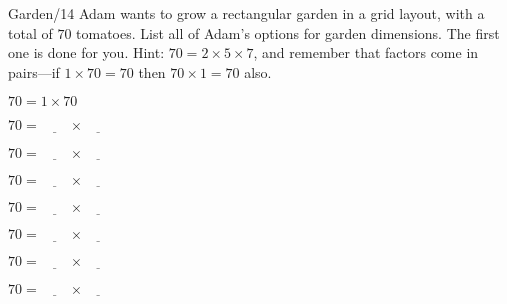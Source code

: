 \documentclass[12pt,letterpaper]{article}
\begin{document}
\begin{problem}{Garden\hfill/14}
 Adam wants to grow a rectangular garden in a grid layout, with a total
 of $70$ tomatoes. List all of Adam's options for garden dimensions.
 The first one is done for you. Hint: $70=2\times5\times7$, and remember
 that factors come in pairs---if $1 \times 70 = 70$ then $70 \times 1 = 70$
 also.

 \begin{itemize}
  \begin{multicols}{2}
    \item $70 = 1 \times 70$
    \item $70 = \underline{\hspace{2em}} \times \underline{\hspace{2em}}$
    \item $70 = \underline{\hspace{2em}} \times \underline{\hspace{2em}}$
    \item $70 = \underline{\hspace{2em}} \times \underline{\hspace{2em}}$
    \item $70 = \underline{\hspace{2em}} \times \underline{\hspace{2em}}$
    \item $70 = \underline{\hspace{2em}} \times \underline{\hspace{2em}}$
    \item $70 = \underline{\hspace{2em}} \times \underline{\hspace{2em}}$
    \item $70 = \underline{\hspace{2em}} \times \underline{\hspace{2em}}$
  \end{multicols}
 \end{itemize}
\end{problem}
\end{document}
